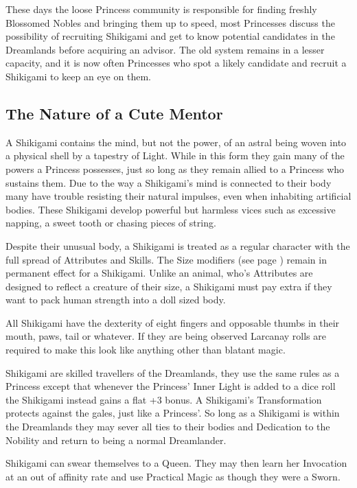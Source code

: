 These days the loose Princess community is responsible for finding freshly Blossomed Nobles and bringing them up to speed, most Princesses discuss the possibility of recruiting Shikigami and get to know potential candidates in the Dreamlands before acquiring an advisor. The old system remains in a lesser capacity, and it is now often Princesses who spot a likely candidate and recruit a Shikigami to keep an eye on them.

\subsection*{The Nature of a Cute Mentor}

A Shikigami contains the mind, but not the power, of an astral being woven into a physical shell by a tapestry of Light. While in this form they gain many of the powers a Princess possesses, just so long as they remain allied to a Princess who sustains them. Due to the way a Shikigami's mind is connected to their body many have trouble resisting their natural impulses, even when inhabiting artificial bodies. These Shikigami develop powerful but harmless vices such as excessive napping, a sweet tooth or chasing pieces of string.

Despite their unusual body, a Shikigami is treated as a regular character with the full spread of Attributes and Skills. The Size modifiers (see page \pageref{SizeTable}) remain in permanent effect for a Shikigami. Unlike an animal, who's Attributes are designed to reflect a creature of their size, a Shikigami must pay extra if they want to pack human strength into a doll sized body.

All Shikigami have the dexterity of eight fingers and opposable thumbs in their mouth, paws, tail or whatever. If they are being observed Larcanay rolls are required to make this look like anything other than blatant magic.

Shikigami are skilled travellers of the Dreamlands, they use the same rules as a Princess except that whenever the Princess' Inner Light is added to a dice roll the Shikigami instead gains a flat +3 bonus. A Shikigami's Transformation protects against the gales, just like a Princess'. So long as a Shikigami is within the Dreamlands they may sever all ties to their bodies and Dedication to the Nobility and return to being a normal Dreamlander. 

Shikigami can swear themselves to a Queen. They may then learn her Invocation at an out of affinity rate and use Practical Magic as though they were a Sworn.

